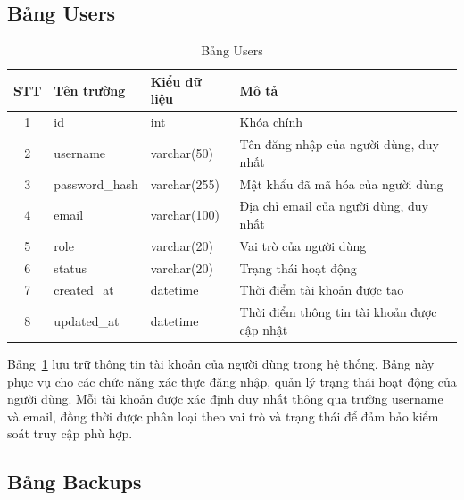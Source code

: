 \documentclass[../DoAn.tex]{subfiles}
\begin{document}
\subsection{Bảng Users}

\begin{table}[H]
\centering
\begin{tabular}{|c|l|l|l|}
\hline
\textbf{STT} & \textbf{Tên trường}   & \textbf{Kiểu dữ liệu} & \textbf{Mô tả}                              \\ \hline
1            & id                    & int                  & Khóa chính\\ \hline
2            & username              & varchar(50)          & Tên đăng nhập của người dùng, duy nhất      \\ \hline
3            & password\_hash        & varchar(255)         & Mật khẩu đã mã hóa của người dùng           \\ \hline
4            & email                 & varchar(100)         & Địa chỉ email của người dùng, duy nhất      \\ \hline
5            & role                  & varchar(20)          & Vai trò của người dùng \\ \hline
6            & status                & varchar(20)          & Trạng thái hoạt động \\ \hline
7            & created\_at           & datetime             & Thời điểm tài khoản được tạo                \\ \hline
8            & updated\_at           & datetime             & Thời điểm thông tin tài khoản được cập nhật \\ \hline
\end{tabular}
\caption{Bảng Users}
\label{tab:users}
\end{table}

Bảng~\ref{tab:users} lưu trữ thông tin tài khoản của người dùng trong hệ thống. Bảng này phục vụ cho các chức năng xác thực đăng nhập, quản lý trạng thái hoạt động của người dùng. Mỗi tài khoản được xác định duy nhất thông qua trường username và email, đồng thời được phân loại theo vai trò và trạng thái để đảm bảo kiểm soát truy cập phù hợp.

\subsection{Bảng Backups}
\end{document}
